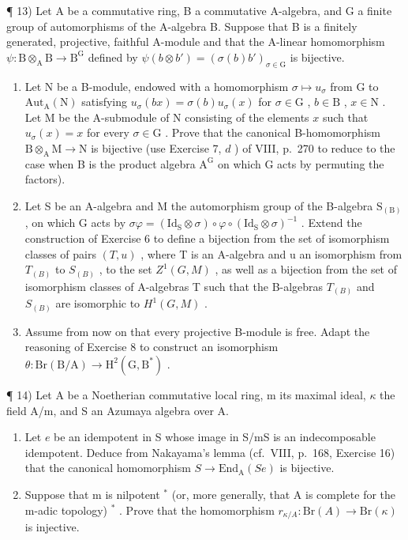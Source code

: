 ¶ 13) Let A be a commutative ring, B a commutative A-algebra, and G a finite group of automorphisms of the A-algebra B. Suppose that B is a finitely generated, projective, faithful A-module and that the A-linear homomorphism \(\psi : \mathrm{B} \otimes_{\mathrm{A}} \mathrm{B} \to \mathrm{B}^{\mathrm{G}}\) defined by \(\psi(b \otimes b') = (\sigma(b)b')_{\sigma \in \mathrm{G}}\) is bijective.

\begin{enumerate}
\def\labelenumi{\alph{enumi})}
\item
  Let N be a B-module, endowed with a homomorphism \(\sigma \mapsto u_{\sigma}\) from G to \(\mathrm{Aut}_{\mathrm{A}}(\mathrm{N})\) satisfying \(u_{\sigma}(bx) = \sigma(b)u_{\sigma}(x)\) for \(\sigma \in \mathrm{G}\) , \(b \in \mathrm{B}\) , \(x \in \mathrm{N}\) . Let M be the A-submodule of N consisting of the elements \(x\) such that \(u_{\sigma}(x) = x\) for every \(\sigma \in \mathrm{G}\) . Prove that the canonical B-homomorphism \(\mathrm{B} \otimes_{\mathrm{A}} \mathrm{M} \to \mathrm{N}\) is bijective (use Exercise 7, \(d\) ) of VIII, p.~270 to reduce to the case when B is the product algebra \(\mathrm{A}^{\mathrm{G}}\) on which G acts by permuting the factors).
\item
  Let S be an A-algebra and M the automorphism group of the B-algebra \(\mathrm{S}_{(\mathrm{B})}\) , on which G acts by \(\sigma\varphi = (\mathrm{Id}_{\mathrm{S}} \otimes \sigma) \circ \varphi \circ (\mathrm{Id}_{\mathrm{S}} \otimes \sigma)^{-1}\) . Extend the construction of Exercise 6 to define a bijection from the set of isomorphism classes of pairs \((T,u)\) , where T is an A-algebra and u an isomorphism from \(T_{(B)}\) to \(S_{(B)}\) , to the set \(Z^{1}(G,M)\) , as well as a bijection from the set of isomorphism classes of A-algebras T such that the B-algebras \(T_{(B)}\) and \(S_{(B)}\) are isomorphic to \(H^{1}(G,M)\) .
\item
  Assume from now on that every projective B-module is free. Adapt the reasoning of Exercise 8 to construct an isomorphism \(\theta : \mathrm{Br}(\mathrm{B} / \mathrm{A}) \to \mathrm{H}^2(\mathrm{G}, \mathrm{B}^*)\) .
\end{enumerate}

¶ 14) Let A be a Noetherian commutative local ring, m its maximal ideal, \(\kappa\) the field A/m, and S an Azumaya algebra over A.

\begin{enumerate}
\def\labelenumi{\alph{enumi})}
\item
  Let \(e\) be an idempotent in S whose image in S/mS is an indecomposable idempotent. Deduce from Nakayama's lemma (cf.~VIII, p.~168, Exercise 16) that the canonical homomorphism \(S \to \mathrm{End}_{\mathrm{A}}(Se)\) is bijective.
\item
  Suppose that m is nilpotent \(^{*}\) (or, more generally, that A is complete for the m-adic topology) \(^{*}\) . Prove that the homomorphism \(r_{\kappa/A}: \mathrm{Br}(A) \to \mathrm{Br}(\kappa)\) is injective.
\end{enumerate}

